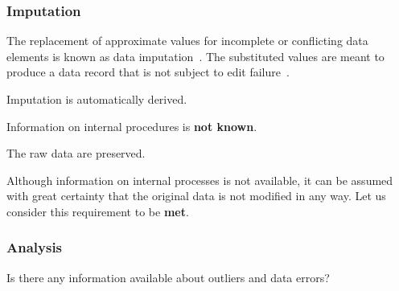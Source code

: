 \subsubsection{Imputation}

The replacement of approximate values for incomplete or conflicting data elements is known as data imputation~\cite{data-imputation}.
The substituted values are meant to produce a data record that is not subject to edit failure~\cite{data-imputation}.

\begin{QandA}
    \item Imputation is automatically derived.
    \begin{answered}
        Information on internal procedures is \textbf{not known}.
    \end{answered}

    \item The raw data are preserved.
    \begin{answered}
        Although information on internal processes is not available, it can be assumed with great certainty that the original data is not modified in any way.
        Let us consider this requirement to be \textbf{met}.
    \end{answered}

\end{QandA}

\subsubsection{Analysis}

Is there any information available about outliers and data errors?

